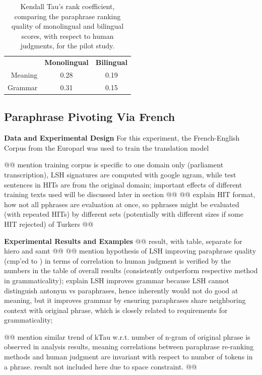 \documentclass[11pt]{article}
\begin{document}
\begin{table}
\begin{center}
\footnotesize
\begin{tabular}{rcc} 
\hline
\hline
 & {\bf Monolingual} & {\bf Bilingual}\\
 Meaning &  0.28     &  0.19 \\
 Grammar &  0.31   &  0.15 \\
\end{tabular}
\caption{\label{table3} \small Kendall Tau's rank coefficient, comparing the paraphrase ranking quality of monolingual and bilingual scores, with respect to human judgments, for the pilot study.}
\label{tbl:Kendall}
\end{center}
\end{table}


\subsection{Paraphrase Pivoting Via French}
{\bf Data and Experimental Design}
For this experiment, the French-English Corpus from the Europarl  \cite{Koehn05} was used to train the translation model 

@@ mention training corpus is specific to one domain only (parliament transcription), LSH signatures are computed with google ngram, while test sentences in HITs are from the original domain; important effects of different training texts used will be discussed later in section @@ 
@@ explain HIT format, how not all pphrases are evaluation at once, so pphrases might be evaluated (with repeated HITs) by different sets (potentially with different sizes if some HIT rejected) of Turkers @@

{\bf Experimental Results and Examples}
@@ result, with table, separate for hiero and samt @@
@@ mention hypothesis of LSH improving paraphrase quality (cmp'ed to ) in terms of correlation to human judgment is verified by the numbers in the table of overall results (consistently outperform respective method in grammaticality);  explain LSH improves grammar because LSH cannot distinguish antonym vs paraphrases, hence inherently would not do good at meaning, but it improves grammar by ensuring paraphrases share neighboring context with original phrase, which is closely related to requirements for grammaticality; 

@@ mention similar trend of kTau w.r.t. number of n-gram of original phrase is observed in analysis results, meaning correlations between paraphrase re-ranking methods and human judgment are invariant with respect to number of tokens in a phrase. result not included here due to space constraint. @@
\end{document}
